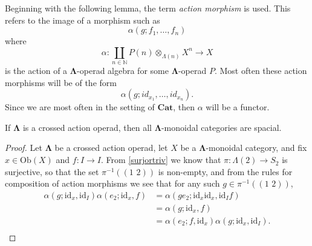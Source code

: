 \documentclass{amsbook} %
\newcommand{\mb}{\mathbf}
\newcommand{\id}{\textrm{id}}
\newcommand{\ML}{\mathbf{\Lambda}}
\newcommand{\trans}[2]{( #1 \, \, #2 )}
\numberwithin{section}{chapter}
\begin{document}
\begin{rem}
Beginning with the following lemma, the term \textit{action morphism} is used. This refers to the image of a morphism such as
  \[
    \alpha(g;f_1,\ldots,f_n)
  \]
where
  \[
    \alpha \colon \coprod_{n \in \mathbb{N}} P(n) \otimes_{\Lambda(n)} X^n \rightarrow X
  \]
is the action of a $\ML$-operad algebra for some $\ML$-operad $P$. Most often these action morphisms will be of the form
  \[
    \alpha(g;id_{x_1},\ldots,id_{x_{n}}).
  \]
Since we are most often in the setting of $\mb{Cat}$, then $\alpha$ will be a functor.
\end{rem}
\begin{lem}\label{spacial} If $\ML$ is a crossed action operad, then all $\ML$-monoidal categories are spacial.\end{lem}
\begin{proof}
Let $\ML$ be a crossed action operad, let $X$ be a $\ML$-monoidal category, and fix $x \in \mathrm{Ob}(X)$ and \( f\colon I \rightarrow I \). From \cref{surjortriv} we know that \( \pi \colon \Lambda(2) \rightarrow S_2 \) is surjective, so that the set $\pi^{-1}(  \trans{1}{2}  )$ is non-empty,
and from the rules for composition of action morphisms we see that for any such $g \in \pi^{-1}(  \trans{1}{2}  )$,
  \begin{align*}
    \alpha(g  ;  \id_x,  \id_I  )\alpha(  e_2  ;  \id_x,  f  ) &= \alpha(ge_2 ; \id_x \id_x, \id_I f)\\
    &= \alpha(g  ;  \id_x, f) \\
    &= \alpha(e_2; f, \id_x )\alpha(g; \id_x, \id_I). \\
  \end{align*}


\end{proof}
\end{document}
